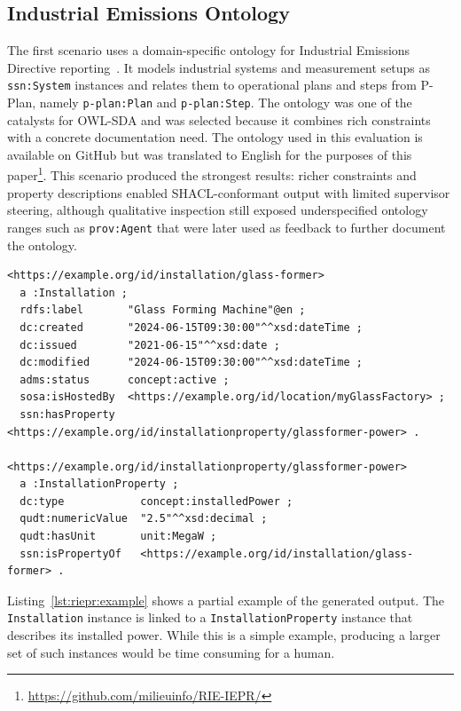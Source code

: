 \subsection{Industrial Emissions Ontology}
The first scenario uses a domain-specific ontology for Industrial Emissions Directive reporting~\cite{EU2024_1244}. It models industrial systems and measurement setups as \texttt{ssn:System} instances and relates them to operational plans and steps from P-Plan, namely \texttt{p-plan:Plan} and \texttt{p-plan:Step}. The ontology was one of the catalysts for OWL-SDA and was selected because it combines rich constraints with a concrete documentation need. The ontology used in this evaluation is available on GitHub but was translated to English for the purposes of this paper\footnote{\url{https://github.com/milieuinfo/RIE-IEPR/}}. This scenario produced the strongest results: richer constraints and property descriptions enabled SHACL-conformant output with limited supervisor steering, although qualitative inspection still exposed underspecified ontology ranges such as \texttt{prov:Agent} that were later used as feedback to further document the ontology.

\begin{listing}[htb]
\begin{verbatim}
<https://example.org/id/installation/glass-former> 
  a :Installation ;
  rdfs:label       "Glass Forming Machine"@en ;
  dc:created       "2024-06-15T09:30:00"^^xsd:dateTime ;
  dc:issued        "2021-06-15"^^xsd:date ;
  dc:modified      "2024-06-15T09:30:00"^^xsd:dateTime ;
  adms:status      concept:active ;
  sosa:isHostedBy  <https://example.org/id/location/myGlassFactory> ;
  ssn:hasProperty  <https://example.org/id/installationproperty/glassformer-power> .

<https://example.org/id/installationproperty/glassformer-power> 
  a :InstallationProperty ;
  dc:type            concept:installedPower ;
  qudt:numericValue  "2.5"^^xsd:decimal ;
  qudt:hasUnit       unit:MegaW ;
  ssn:isPropertyOf   <https://example.org/id/installation/glass-former> .
\end{verbatim}
\caption{Partial AI-generated output for the industrial emissions ontology.} \label{lst:riepr:example}
\end{listing}

Listing~\ref{lst:riepr:example} shows a partial example of the generated output. The \texttt{Installation} instance is linked to a \texttt{InstallationProperty} instance that describes its installed power. While this is a simple example, producing a larger set of such instances would be time consuming for a human.

